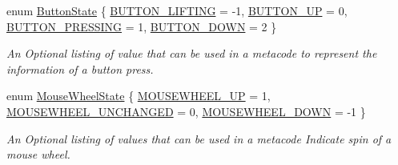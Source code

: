 \begin{DoxyCompactItemize}
enum \hyperlink{classMetaCode_a8bcce67af20f4f779ba6f5387e438077}{ButtonState} \{ \hyperlink{classMetaCode_a8bcce67af20f4f779ba6f5387e438077aa16bc921174974d9e30752eff7af8336}{BUTTON\_\-LIFTING} =  -\/1, 
\hyperlink{classMetaCode_a8bcce67af20f4f779ba6f5387e438077a87e2c9bdb3c969158f85543759dce244}{BUTTON\_\-UP} =  0, 
\hyperlink{classMetaCode_a8bcce67af20f4f779ba6f5387e438077a1113791ce46932b93099ba765116b0d7}{BUTTON\_\-PRESSING} =  1, 
\hyperlink{classMetaCode_a8bcce67af20f4f779ba6f5387e438077a73ef49474af25ad4c503fe27420c6448}{BUTTON\_\-DOWN} =  2
 \}
\begin{DoxyCompactList}\small\item\em An Optional listing of value that can be used in a metacode to represent the information of a button press. \item\end{DoxyCompactList}\item 
enum \hyperlink{classMetaCode_a31155465656363d4ecdf9ce7ae5d7227}{MouseWheelState} \{ \hyperlink{classMetaCode_a31155465656363d4ecdf9ce7ae5d7227af0b2479902511454e2018979ee5e39e5}{MOUSEWHEEL\_\-UP} =  1, 
\hyperlink{classMetaCode_a31155465656363d4ecdf9ce7ae5d7227a70b73f42dccd13d9652d83c5f24cd966}{MOUSEWHEEL\_\-UNCHANGED} =  0, 
\hyperlink{classMetaCode_a31155465656363d4ecdf9ce7ae5d7227a912c43d8503790ded562c0c4a6a62ca7}{MOUSEWHEEL\_\-DOWN} =  -\/1
 \}
\begin{DoxyCompactList}\small\item\em An Optional listing of values that can be used in a metacode Indicate spin of a mouse wheel. \item\end{DoxyCompactList}\end{DoxyCompactItemize}
